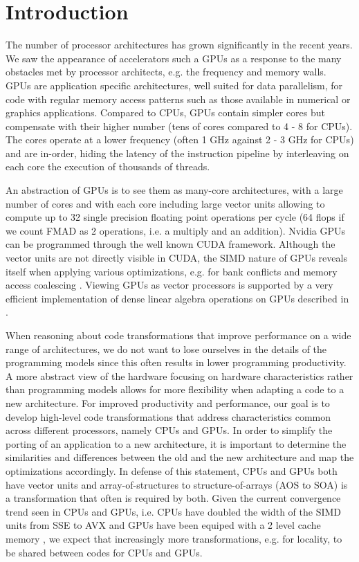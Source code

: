 \section{Introduction}
The number of processor architectures has grown significantly in the recent
years. We saw the appearance of accelerators such a GPUs as a response to the
many obstacles met by processor architects, e.g. the frequency and memory walls.
GPUs are application specific architectures, well suited for data parallelism,
for code with regular memory access patterns such as those available in
numerical or graphics applications. Compared to CPUs, GPUs contain simpler cores
but compensate with their higher number (tens of cores compared to 4 - 8 for
CPUs). The cores operate at a lower frequency (often 1 GHz against 2 - 3 GHz for
CPUs) and are in-order, hiding the latency of the instruction pipeline by
interleaving on each core the execution of thousands of threads.

An abstraction of GPUs is to see them as many-core architectures, with a large
number of cores and with each core including large vector units allowing to
compute up to 32 single precision floating point operations per cycle (64 flops
if we count FMAD as 2 operations, i.e. a multiply and an addition). Nvidia GPUs
can be programmed through the well known CUDA framework. Although the vector
units are not directly visible in CUDA, the SIMD nature of GPUs reveals itself
when applying various optimizations, e.g. for bank conflicts and memory access
coalescing \cite{cuda}. Viewing GPUs as vector processors is supported by a very
efficient implementation of dense linear algebra operations on GPUs described in
\cite{Volkov:2008:BGT:1413370.1413402}.

When reasoning about code transformations that improve performance on a wide
range of architectures, we do not want to lose ourselves in the details of the
programming models since this often results in lower programming productivity.
A more abstract view of the hardware focusing on hardware characteristics rather
than programming models allows for more flexibility when adapting a code to a
new architecture. For improved productivity and performance, our goal is to
develop high-level code transformations that address characteristics common
across different processors, namely CPUs and GPUs. In order to simplify the
porting of an application to a new architecture, it is important to determine
the similarities and differences between the old and the new architecture and
map the optimizations accordingly. In defense of this statement, CPUs and GPUs
both have vector units and array-of-structures to structure-of-arrays (AOS to
SOA) is a transformation that often is required by both. Given the current
convergence trend seen in CPUs and GPUs, i.e. CPUs have doubled the width of the
SIMD units from SSE to AVX and GPUs have been equiped with a 2 level cache
memory \cite{fermi}, we expect that increasingly more transformations, e.g. for
locality, to be shared between codes for CPUs and GPUs.

